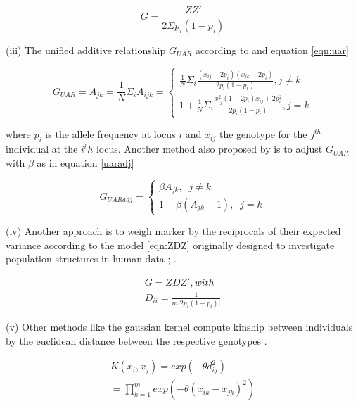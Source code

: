 \begin{equation}
  G = \frac{ZZ'}{2 \Sigma p_i (1-p_i)} 
\label{eqn:vanraden}
\end{equation}

(iii) The unified additive relationship $G_{UAR}$ according to \cite{yang2010common} and equation \ref{eqn:uar}

\begin{equation}
  G_{UAR} =  A_{jk} = \frac{1}{N} \Sigma_i{A_{ijk}} = \left\{
    \!\begin{aligned}
      \frac{1}{N} \Sigma_{i} \frac{(x_{ij} - 2p_i)(x_{ik} - 2p_i)}{2p_i  (1-p_i)}, j \ne k \\
      1 + \frac{1}{N} \Sigma_i \frac{x_{ij}^2 (1+2p_i) x_{ij} + 2p_i^2 }{2p_i (1-p_i)}, j = k     
    \end{aligned}
  \right.
  \label{eqn:uar}
\end{equation}

where $p_i$ is the allele frequency at locus $i$ and $x_{ij}$ the genotype for the $j^{th}$ individual at the
$i^th$ locus. Another method also proposed by \cite{yang2010common} is to adjust $G_{UAR}$ with $\beta$ as in
equation \ref{uaradj}

\begin{equation}
  G_{UARadj} = \left\{
    \!\begin{aligned}
      \beta A_{jk}, \;\; j \ne k \\
      1 + \beta (A_{jk}-1 ), \;\; j = k      
    \end{aligned}
    \right.
  \label{eqn:uaradj}
\end{equation}

(iv) Another approach is to weigh marker by the reciprocals of their expected variance according to the model
\ref{eqn:ZDZ} originally designed to investigate population structures in human data
\cite{leutenegger2003estimation}; \cite{amin2007genomic}.

\begin{equation}
  \!\begin{aligned}
    G = ZDZ' , with \\
    D_{ii} = \frac{1}{m | 2p_i(1-p_i) | }
  \end{aligned}
  \label{eqn:ZDZ}
\end{equation}


(v) Other methods like the gaussian kernel compute kinship between individuals by the euclidean distance
between the respective genotypes \cite{morota2014kernel}.

\begin{equation}
  \!\begin{aligned}
    K(x_i,x_j) = exp (- \theta d_{ij}^2) \\
    = \prod_{k=1}^m exp (- \theta(x_{ik} - x_{jk})^2)
  \end{aligned}
  \label{eqn:gauss}
\end{equation}

